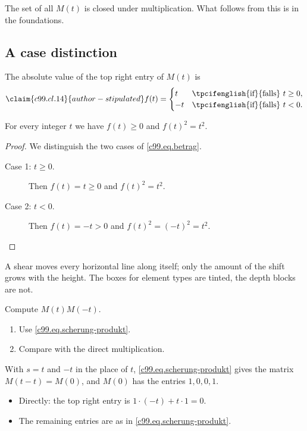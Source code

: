 \begin{remark}
  The set of all $M(t)$ is closed under multiplication. What follows from this
  is in the foundations.
\end{remark}

\subsection{A case distinction}\label{c99.s2.2}

The absolute value of the top right entry of $M(t)$ is
\begin{equation}\label{c99.eq.betrag}\claim{c99.cl.14}{author-stipulated}
  f(t) =
  \begin{cases}
    t  & \text{\tpcifenglish{if}{falls}}\ t \geq 0, \\
    -t & \text{\tpcifenglish{if}{falls}}\ t < 0.
  \end{cases}
\end{equation}

\begin{proposition}\label{c99.prop.betrag}
  For every integer $t$ we have $f(t) \geq 0$ and $f(t)^2 = t^2$.
\end{proposition}
\begin{proof}
  We distinguish the two cases of \eqref{c99.eq.betrag}.
  \begin{description}
    \item[Case 1: $t \geq 0$.] Then $f(t) = t \geq 0$ and $f(t)^2 = t^2$.
    \item[Case 2: $t < 0$.] Then $f(t) = -t > 0$ and
      $f(t)^2 = (-t)^2 = t^2$.
  \end{description}
\end{proof}

\begin{intuition}
  A shear moves every horizontal line along itself; only the amount of the shift
  grows with the height. The boxes for element types are tinted, the depth
  blocks are not.
\end{intuition}

\begin{exercise}\label{c99.exc.umkehrung}
  Compute $M(t)M(-t)$.
  \begin{enumerate}
    \item Use \eqref{c99.eq.scherung-produkt}.
    \item Compare with the direct multiplication.
  \end{enumerate}
\end{exercise}
\begin{solution}
  With $s = t$ and $-t$ in the place of $t$, \eqref{c99.eq.scherung-produkt}
  gives the matrix $M(t - t) = M(0)$, and $M(0)$ has the entries $1, 0, 0, 1$.
  \begin{itemize}
    \item Directly: the top right entry is $1\cdot(-t) + t\cdot 1 = 0$.
    \item The remaining entries are as in \eqref{c99.eq.scherung-produkt}.
  \end{itemize}
\end{solution}

